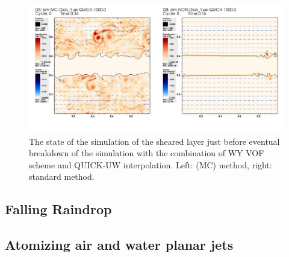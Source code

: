 {%
\begin{figure}
\begin{center}
\includegraphics[width=\textwidth]{Figures/Sagar/shear.png}
\end{center}
\caption{The state of the simulation of the sheared layer just before eventual 
breakdown of the simulation with the combination of WY VOF scheme
and QUICK-UW interpolation. Left: (MC) method, right: standard method.}
\label{shelay}
\end{figure}
} 

\subsection{Falling Raindrop}


\subsection{Atomizing air and water planar jets}

